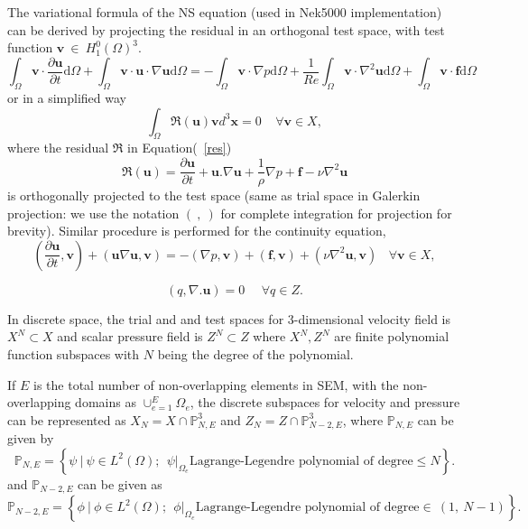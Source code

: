 The variational formula of the NS equation (used in Nek5000 implementation) can be derived by projecting the residual in an orthogonal test space, with test function $\pmb{v}\ \in \ H^{0}_{1}(\Omega)^{3}$.
\begin{equation}
\int_{\Omega} \pmb{v}\cdot \frac{\partial \pmb{u}}{\partial t}\mbox{d} \Omega +  \int_{\Omega} \pmb{v}\cdot \pmb{u} \cdot \nabla \pmb{u}\mbox{d} \Omega = -\int_{\Omega} \pmb{v}\cdot \nabla p\mbox{d} \Omega + \frac{1}{Re} \int_{\Omega} \pmb{v}\cdot \nabla ^{2} \pmb{u}\mbox{d} \Omega + \int_{\Omega} \pmb{v}\cdot \pmb{f}\mbox{d} \Omega
\end{equation}
or in a simplified way
\begin{equation}
\int_{\Omega}\mathfrak{{R}}(\pmb{u})\pmb{v}d^{3}\pmb{x} = 0 \ \ \ \ \ \forall\pmb{v}\in X, \label{res}
\end{equation}
where the residual $\mathfrak{{R}}$ in Equation(~\ref{res})
\begin{equation}
 \mathfrak{{R}}(\pmb{u}) = \frac{\partial \pmb{u}}{\partial t} + \pmb{u}.\nabla \pmb{u} + \frac{1}{\rho}\nabla p + \pmb{f} - \nu \nabla^2 \pmb{u}
\end{equation} 
 is orthogonally projected to the test space (same as trial space in Galerkin projection: we use the notation $( \ , \ )$ for complete integration for projection for brevity). Similar procedure is performed for the continuity equation,
\begin{equation}
\left(\frac{\partial{\pmb{u}}}{\partial t}, \pmb{v}\right) + \left(\pmb{u}\nabla \pmb{u},\pmb{v}\right) = -\left(\nabla p ,\pmb{v}\right) + \left(\pmb{f} , \pmb{v}\right) + \left(\nu \nabla^{2} \pmb{u}, \pmb{v}\right) \ \ \ \ \forall\pmb{v}\in X, \label{weak1}
\end{equation}

\begin{equation}
\left( q , \nabla.\pmb{u}\right) = 0 \ \ \ \ \ \ \forall {q}\in Z. \label{weak2}
\end{equation}


In discrete space, the trial and and test spaces for 3-dimensional velocity field is $X^N \subset X$ and scalar pressure field is $Z^N \subset Z$ where $X^{N}, Z^{N}$ are finite polynomial function subspaces with $N$ being the degree of the polynomial.\\
\par
If $E$ is the total number of non-overlapping elements in SEM, with the non-overlapping domains as $\cup_{e=1}^{E}\Omega_{e}$, the discrete subspaces for velocity and pressure can be represented as 
$X_N = X\cap \mathbb{P}_{N,E}^{3}$ and $Z_N = Z\cap \mathbb{P}_{N-2,E}^{3}$, where $\mathbb{P}_{N,E}$ can be given by
\begin{equation}
\mathbb{P}_{N,E} = \left\{ \psi \ \Big|\ \psi \in L^2(\Omega); \:\:\psi|_{\Omega_e} \mbox{Lagrange-Legendre polynomial of degree} \leq N \right\}. \label{sob2}
\end{equation}
and $\mathbb{P}_{N-2,E}$ can be given as
\begin{equation}
\mathbb{P}_{N-2,E} = \left\{ \phi \ \Big|\ \phi \in L^2(\Omega); \:\:\phi|_{\Omega_e} \mbox{Lagrange-Legendre polynomial of degree} \in \ (1, \ N-1) \right\}. \label{sob3}
\end{equation}

